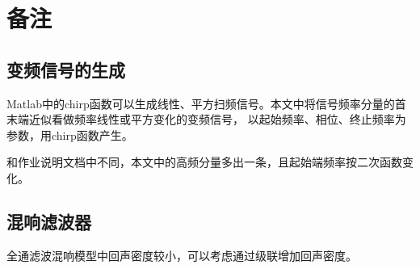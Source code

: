 \documentclass{article}
\begin{document}
        \section{备注}
            \subsection{变频信号的生成}
                Matlab中的chirp函数可以生成线性、平方扫频信号。本文中将信号频率分量的首末端近似看做频率线性或平方变化的变频信号，
                以起始频率、相位、终止频率为参数，用chirp函数产生。

                和作业说明文档中不同，本文中的高频分量多出一条，且起始端频率按二次函数变化。
                
            \subsection{混响滤波器}
                全通滤波混响模型中回声密度较小，可以考虑通过级联增加回声密度。
                
\end{document}
